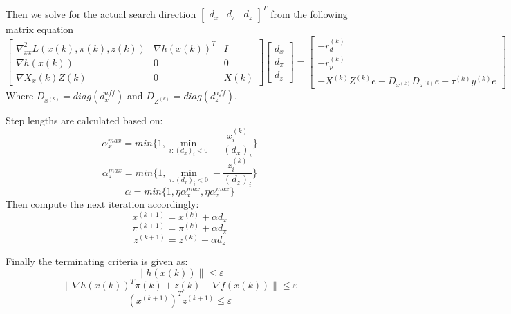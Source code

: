 Then we solve for the actual search direction
$
{\begin{bmatrix}
	d_x& d_\pi& d_z
	\end{bmatrix}}^T
$
from the following matrix equation
\begin{equation}\label{eq:chap4:firstlinear}
\begin{bmatrix}
\nabla^2_{xx} L(x(k),\pi(k),z(k))     & \nabla h(x(k))^T    & I \\
\nabla h(x(k))     & 0     & 0 \\
\nabla X_x(k)Z(k)  & 0     &  X(k) 
\end{bmatrix}
\begin{bmatrix}
d_x\\
d_\pi\\
d_z
\end{bmatrix}
=
\begin{bmatrix}
-r_d^{(k)}\\
-r_p^{(k)}\\
-X^{(k)}Z^{(k)}e+D_{x^{(k)}}D_{z^{(k)}}e+\tau^{(k)}y^{(k)}e
\end{bmatrix}
\end{equation}
Where
$
D_{x^{(k)}}=diag(d_x^{aff})
$
and
$
D_{Z^{(k)}}=diag(d_z^{aff})
$.

Step lengths are calculated based on:
\begin{equation}\label{eq:chap4:affinexsl}
{\alpha}_x^{max}=min\{1,\min_{i:{(d_{x})}_i<0}-\frac{x_i^{(k)}}{{(d_{x})}_i}\}
\end{equation}
\begin{equation}\label{eq:chap4:affinezsl}
{\alpha}_z^{max}=min\{1,\min_{i:{(d_{x})}_i<0}-\frac{z_i^{(k)}}{{(d_{z})}_i}\}
\end{equation}
\begin{equation}\label{eq:chap4:alpha}
\alpha=min\{1,\eta\alpha_x^{max},\eta\alpha_z^{max}\}
\end{equation}
Then compute the next iteration accordingly:
\begin{equation}\label{eq:chap4:xk1}
x^{(k+1)}=x^{(k)}+\alpha d_x
\end{equation}
\begin{equation}\label{eq:chap4:pik1}
\pi^{(k+1)}=\pi^{(k)}+\alpha d_\pi
\end{equation}
\begin{equation}\label{eq:chap4:zk1}
z^{(k+1)}=z^{(k)}+\alpha d_z
\end{equation}

Finally the terminating criteria is given as:
\begin{equation}\label{eq:chap4:term1}
\|h(x(k))\|\le\varepsilon
\end{equation}
\begin{equation}\label{eq:chap4:term2}
\|\nabla {h(x(k))}^T \pi(k)+z(k)-\nabla f(x(k))\|\le\varepsilon
\end{equation}
\begin{equation}\label{eq:chap4:term3}
(x^{(k+1)})^Tz^{(k+1)}\le\varepsilon
\end{equation}

